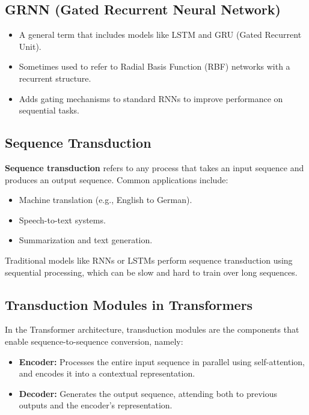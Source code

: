 \documentclass{article}
\begin{document}
\subsection{GRNN (Gated Recurrent Neural Network)}

\begin{itemize}
    \item A general term that includes models like LSTM and GRU (Gated Recurrent Unit).
    \item Sometimes used to refer to Radial Basis Function (RBF) networks with a recurrent structure.
    \item Adds gating mechanisms to standard RNNs to improve performance on sequential tasks.
\end{itemize}

\subsection{Sequence Transduction}

\textbf{Sequence transduction} refers to any process that takes an input sequence and produces an output sequence. Common applications include:

\begin{itemize}
    \item Machine translation (e.g., English to German).
    \item Speech-to-text systems.
    \item Summarization and text generation.
\end{itemize}

Traditional models like RNNs or LSTMs perform sequence transduction using sequential processing, which can be slow and hard to train over long sequences.

\subsection{Transduction Modules in Transformers}

In the Transformer architecture, transduction modules are the components that enable sequence-to-sequence conversion, namely:

\begin{itemize}
    \item \textbf{Encoder:} Processes the entire input sequence in parallel using self-attention, and encodes it into a contextual representation.
    \item \textbf{Decoder:} Generates the output sequence, attending both to previous outputs and the encoder's representation.
\end{itemize}
\end{document}
